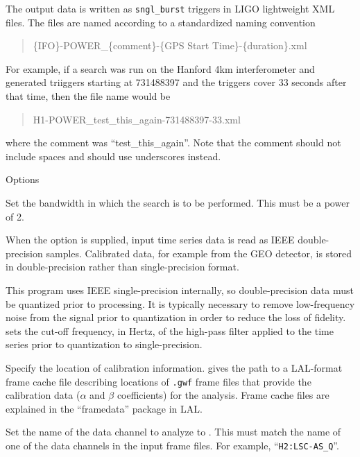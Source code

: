 \begin{entry}
The output data is written as \verb|sngl_burst| triggers in LIGO
lightweight XML files.  The files are named according to a standardized
naming convention
\begin{quote}
\{IFO\}-POWER\_\{comment\}-\{GPS Start Time\}-\{duration\}.xml
\end{quote}
For example, if a search was run on the Hanford 4km interferometer and
generated triiggers starting at 731488397 and the triggers cover 33 seconds
after that time,  then the file name would be 
\begin{quote}
H1-POWER\_test\_this\_again-731488397-33.xml
\end{quote}
where the comment was ``test\_this\_again''.  Note that the comment should
not include spaces and should use underscores instead.

\item[Options]\leavevmode
\begin{entry}
\item[\option{--bandwidth} \parm{Hz}]
Set the bandwidth in which the search is to be performed.  This must be a
power of 2.

\item[\option{--calibrated-data} \parm{high pass frequency}]
When the  option is supplied, input time series
data is read as IEEE double-precision samples.  Calibrated data, for
example from the GEO detector, is stored in double-precision rather than
single-precision format.

This program uses IEEE single-precision internally, so double-precision
data must be quantized prior to processing.  It is typically necessary to
remove low-frequency noise from the signal prior to quantization in order
to reduce the loss of fidelity.   sets the
cut-off frequency, in Hertz, of the high-pass filter applied to the time
series prior to quantization to single-precision.

\item[\option{--calibration-cache} \parm{cache file}]
Specify the location of calibration information.   gives
the path to a LAL-format frame cache file describing locations of
\texttt{.gwf} frame files that provide the calibration data ($\alpha$ and
$\beta$ coefficients) for the analysis.  Frame cache files are explained in
the ``framedata'' package in LAL.

\item[\option{--channel-name} \parm{string}]
Set the name of the data channel to analyze to .  This must
match the name of one of the data channels in the input frame files.  For
example, ``\verb|H2:LSC-AS_Q|''.


\end{entry}
\end{entry}
